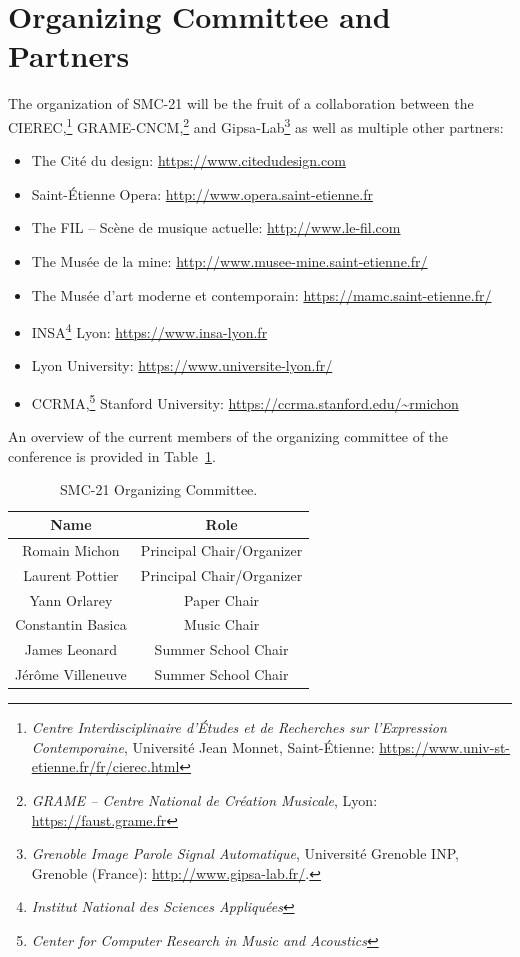 \documentclass[fontsize=12pt]{scrartcl} %
\numberwithin{equation}{section} %
\numberwithin{figure}{section} %
\numberwithin{table}{section} %
\begin{document}
\section{Organizing Committee and Partners}

The organization of SMC-21 will be the fruit of a collaboration between the CIEREC,\footnote{\textit{Centre Interdisciplinaire d'Études et de Recherches sur l'Expression Contemporaine}, Université Jean Monnet, Saint-Étienne: \url{https://www.univ-st-etienne.fr/fr/cierec.html}} GRAME-CNCM,\footnote{\textit{GRAME -- Centre National de Création Musicale}, Lyon: \url{https://faust.grame.fr}} and Gipsa-Lab\footnote{\textit{Grenoble Image Parole Signal Automatique}, Université Grenoble INP, Grenoble (France): \url{http://www.gipsa-lab.fr/}.} as well as multiple other partners:

\begin{itemize}
\item The Cité du design: \url{https://www.citedudesign.com}
\item Saint-Étienne Opera: \url{http://www.opera.saint-etienne.fr}
\item The FIL -- Scène de musique actuelle: \url{http://www.le-fil.com}
\item The Musée de la mine: \url{http://www.musee-mine.saint-etienne.fr/}
\item The Musée d'art moderne et contemporain: \url{https://mamc.saint-etienne.fr/} 
\item INSA\footnote{\textit{Institut National des Sciences Appliquées}} Lyon: \url{https://www.insa-lyon.fr}
\item Lyon University: \url{https://www.universite-lyon.fr/}
\item CCRMA,\footnote{\textit{Center for Computer Research in Music and Acoustics}} Stanford University: \url{https://ccrma.stanford.edu/~rmichon}
\end{itemize}

An overview of the current members of the organizing committee of the conference is provided in Table~\ref{tab:committee}. 

\begin{table}[!htbp]
  \begin{center}
    \begin{tabular}{c | c}
      \textbf{Name} & \textbf{Role} \\
      \hline
      \hline
      Romain Michon & Principal Chair/Organizer \\
      Laurent Pottier & Principal Chair/Organizer \\
      Yann Orlarey & Paper Chair \\
      Constantin Basica & Music Chair \\
      James Leonard & Summer School Chair \\
      Jérôme Villeneuve & Summer School Chair \\
    \end{tabular}
    \caption{SMC-21 Organizing Committee.}
    \label{tab:committee}
  \end{center}
\end{table}
\end{document}
